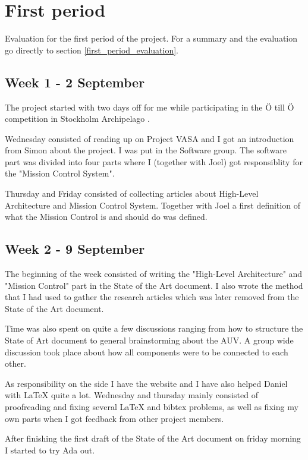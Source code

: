 \section{First period}\label{first_period}
Evaluation for the first period of the project. For a summary and the
evaluation go directly to section \ref{first_period_evaluation}.

\subsection{Week 1 - 2 September}\label{week_1}
The project started with two days off for me while participating in the \"{O}
till \"{O} competition in Stockholm Archipelago \cite{web:otillo}.

Wednesday consisted of reading up on Project VASA and I got an introduction
from Simon about the project. I was put in the Software group. The software
part was divided into four parts where I (together with Joel) got responsiblity
for the "Mission Control System".

Thursday and Friday consisted of collecting articles about High-Level
Architecture and Mission Control System. Together with Joel a first definition
of what the Mission Control is and should do was defined.

\subsection{Week 2 - 9 September}\label{week_2}
The beginning of the week consisted of writing the "High-Level Architecture"
and "Mission Control" part in the State of the Art document. I also wrote
the method that I had used to gather the research articles which was later
removed from the State of the Art document.

Time was also spent on quite a few discussions ranging from how to structure
the State of Art document to general brainstorming about the AUV. A group wide
discussion took place about how all components were to be connected to
each other.

As responsibility on the side I have the website and I have also helped Daniel
with LaTeX quite a lot. Wednesday and thursday mainly consisted of proofreading
and fixing several LaTeX and bibtex problems, as well as fixing my own parts
when I got feedback from other project members.

After finishing the first draft of the State of the Art document on friday
morning I started to try Ada out.

